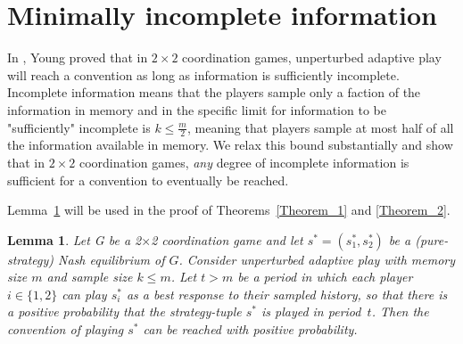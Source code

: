 \documentclass[11.5pt]{article}
\newtheorem{lemma}{Lemma}
\begin{document}
%
%
%
%
%
%
%



\section{Minimally incomplete information} 



In \cite{Young1998}, Young proved that in $2\times 2$ coordination games, unperturbed adaptive play will reach a convention as long as information is sufficiently incomplete. Incomplete information means that the players sample only a faction of the information in memory and in \cite{Young1998} the specific limit for information to be "sufficiently" incomplete is $k \leq \frac{m}{2}$, meaning that players sample at most half of all the information available in memory. 
We relax this bound substantially and show that in $2\times 2$ coordination games, {\emph {any} }degree of incomplete information is sufficient for a convention to eventually be reached.





Lemma~\ref{Lemma_1} will be used in the proof of Theorems~\ref{Theorem_1} and \ref{Theorem_2}.

\vskip12pt




\begin{lemma}\label{Lemma_1} Let G be a 2$\times$2 coordination game and let $s^* = (s^*_1, s^*_2)$ be a (pure-strategy) Nash equilibrium of $G$. Consider unperturbed adaptive play with memory size $m$ and sample size $k\leq m$. Let $t > m$ be a period in which each player~$i\in\{1,2\}$ can play $s^*_i$ as a best response to their sampled history, so that there is a positive probability that the strategy-tuple $s^*$ is played in period~$t$. Then the convention of playing $s^*$ can be reached with positive probability.
\end{lemma}
\end{document}
